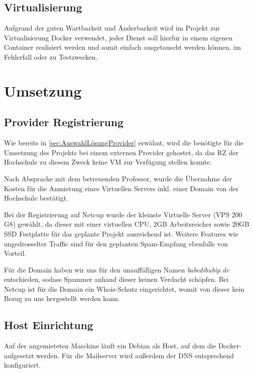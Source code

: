 \documentclass[a4paper,11pt,singlespacing]{article}
\begin{document}
		
	\subsection{Virtualisierung}\label{sec:AuswahlLösungVirtualisierung}
		Aufgrund der guten Wartbarkeit und Änderbarkeit wird im Projekt zur Virtualisierung Docker verwendet, jeder Dienst soll hierfur in einem eigenen Container realisiert werden und somit einfach ausgetauscht werden können, im Fehlerfall oder zu Testzwecken.
		
			
\newpage
\section{Umsetzung}\label{sec:Umsetzung}
	
	\subsection{Provider Registrierung}\label{sec:ProviderRegistrierung} 
		Wie bereits in \autoref{sec:AuswahlLösungProvider} erwähnt, wird die benötigte  für die Umsetzung des Projekts bei einem externen Provider gehostet, da das RZ der Hochschule zu diesem Zweck keine VM zur Verfügung stellen konnte.
		
		Nach Absprache mit dem betreuenden Professor, wurde die Übernahme der Kosten für die Anmietung eines Virtuellen Servers inkl. einer Domain von der Hochschule bestätigt.  
		
		Bei der Registrierung auf \textsf{Netcup} wurde der kleinste Virtuelle Server (VPS 200 G8) gewählt, da dieser mit einer virtuellen CPU, 2GB Arbeitsreicher sowie 20GB SSD Festplatte für das geplante Projekt ausreichend ist. Weitere Features wie ungedrosselter Traffic sind für den geplanten Spam-Empfang ebenfalls von Vorteil.
		
		Für die Domain haben wir uns für den unauffälligen Namen \textit{babedibubip.de} entschieden, sodass Spammer anhand dieser keinen Verdacht schöpfen. Bei \textsf{Netcup} ist für die Domain ein Whois-Schutz eingerichtet, womit von dieser kein Bezug zu uns hergestellt werden kann. 
		
		
	\subsection{Host Einrichtung}\label{sec:UmsetzungHostEinrichtung}
		Auf der angemieteten Maschine läuft ein Debian als Host, auf dem die Docker- aufgesetzt werden. Für die Mailserver wird außerdem der DNS entsprechend konfiguriert.
		
\end{document}

